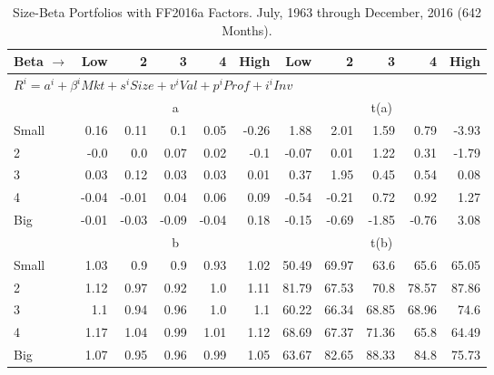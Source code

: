 
\begin{table}[!ht]
\centering
\caption{Size-Beta Portfolios with FF2016a Factors. \footnotesize{July, 1963 through December, 2016 (642 Months).}}
\begin{tabular}{lrrrrrrrrrr}
  \toprule
    Beta $\rightarrow$ & Low & 2 & 3 & 4 & High & Low & 2 & 3 & 4 & High \\ 
  \midrule
  \multicolumn{11}{l}{$R^i=a^i+\beta^iMkt+s^iSize+v^iVal+p^iProf+i^iInv$} \\

  
    
      & \multicolumn{5}{c}{a} & \multicolumn{5}{c}{t(a)}
    
    \\
      \cmidrule(r){2-6} \cmidrule(r){7-11}

    Small   & 0.16  & 0.11  & 0.1  & 0.05  & -0.26  & 1.88  & 2.01  & 1.59  & 0.79  & -3.93  \\
         2  & -0.0  & 0.0  & 0.07  & 0.02  & -0.1  & -0.07  & 0.01  & 1.22  & 0.31  & -1.79  \\
         3  & 0.03  & 0.12  & 0.03  & 0.03  & 0.01  & 0.37  & 1.95  & 0.45  & 0.54  & 0.08  \\
         4  & -0.04  & -0.01  & 0.04  & 0.06  & 0.09  & -0.54  & -0.21  & 0.72  & 0.92  & 1.27  \\
    Big     & -0.01  & -0.03  & -0.09  & -0.04  & 0.18  & -0.15  & -0.69  & -1.85  & -0.76  & 3.08  \\

  
    
      & \multicolumn{5}{c}{b} & \multicolumn{5}{c}{t(b)}
    
    \\
      \cmidrule(r){2-6} \cmidrule(r){7-11}

    Small   & 1.03  & 0.9  & 0.9  & 0.93  & 1.02  & 50.49  & 69.97  & 63.6  & 65.6  & 65.05  \\
         2  & 1.12  & 0.97  & 0.92  & 1.0  & 1.11  & 81.79  & 67.53  & 70.8  & 78.57  & 87.86  \\
         3  & 1.1  & 0.94  & 0.96  & 1.0  & 1.1  & 60.22  & 66.34  & 68.85  & 68.96  & 74.6  \\
         4  & 1.17  & 1.04  & 0.99  & 1.01  & 1.12  & 68.69  & 67.37  & 71.36  & 65.8  & 64.49  \\
    Big     & 1.07  & 0.95  & 0.96  & 0.99  & 1.05  & 63.67  & 82.65  & 88.33  & 84.8  & 75.73  \\

  
    

\end{tabular}
\end{table}
